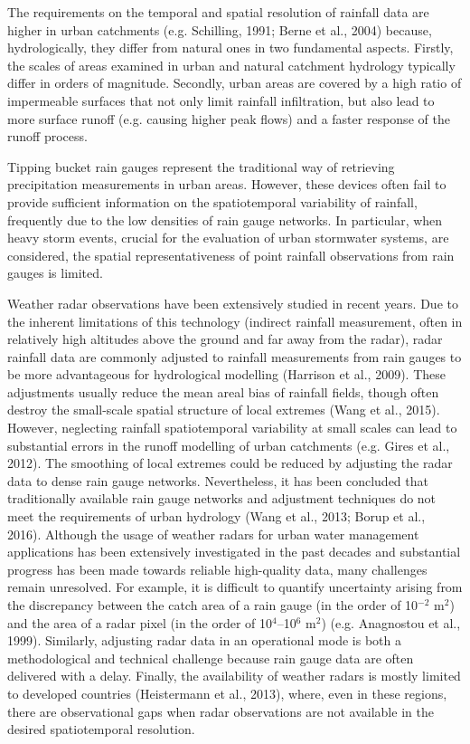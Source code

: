 \documentclass{ctuthesis}\usepackage[]{graphicx}\usepackage[]{color}
\begin{document}
The requirements on the temporal and spatial resolution of rainfall data are higher in urban catchments (e.g. Schilling, 1991; Berne et al., 2004) because, hydrologically, they differ from natural ones in two fundamental aspects. Firstly, the scales of areas examined in urban and natural catchment hydrology typically differ in orders of magnitude. Secondly, urban areas are covered by a high ratio of impermeable surfaces that not only limit rainfall infiltration, but also lead to more surface runoff (e.g. causing higher peak flows) and a faster response of the runoff process.

Tipping bucket rain gauges represent the traditional way of retrieving precipitation measurements in urban areas. However, these devices often fail to provide sufficient information on the spatiotemporal variability of rainfall, frequently due to the low densities of rain gauge networks. In particular, when heavy storm events, crucial for the evaluation of urban stormwater systems, are considered, the spatial representativeness of point rainfall observations from rain gauges is limited. 

Weather radar observations have been extensively studied in recent years. Due to the inherent limitations of this technology (indirect rainfall measurement, often in relatively high altitudes above the ground and far away from the radar), radar rainfall data are commonly adjusted to rainfall measurements from rain gauges to be more advantageous for hydrological modelling (Harrison et al., 2009). These adjustments usually reduce the mean areal bias of rainfall fields, though often destroy the small-scale spatial structure of local extremes (Wang et al., 2015). However, neglecting rainfall spatiotemporal variability at small scales can lead to substantial errors in the runoff modelling of urban catchments (e.g. Gires et al., 2012). The smoothing of local extremes could be reduced by adjusting the radar data to dense rain gauge networks. Nevertheless, it has been concluded that traditionally available rain gauge networks and adjustment techniques do not meet the requirements of urban hydrology (Wang et al., 2013; Borup et al., 2016). Although the usage of weather radars for urban water management applications has been extensively investigated in the past decades and substantial progress has been made towards reliable high-quality data, many challenges remain unresolved. For example, it is difficult to quantify uncertainty arising from the discrepancy between the catch area of a rain gauge (in the order of 10$^{-2}$ m$^2$) and the area of a radar pixel (in the order of 10$^4$--10$^6$ m$^2$) (e.g. Anagnostou et al., 1999). Similarly, adjusting radar data in an operational mode is both a methodological and technical challenge because rain gauge data are often delivered with a delay. Finally, the availability of weather radars is mostly limited to developed countries (Heistermann et al., 2013), where, even in these regions, there are observational gaps when radar observations are not available in the desired spatiotemporal resolution.
\end{document}
